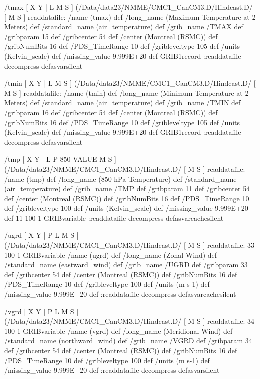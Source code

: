 \begin{ingrid}
/tmax {
[ X Y | L M S ]
(/Data/data23/NMME/CMC1_CanCM3.D/Hindcast.D/%
[ M S ]
readdatafile: 
/name (tmax) def
/long_name (Maximum Temperature at 2 Meters) def
/standard_name (air_temperature) def
/grib_name /TMAX def
/gribparam 15 def
/gribcenter 54 def
/center (Montreal (RSMC)) def
/gribNumBits 16 def
/PDS_TimeRange 10 def
/gribleveltype 105 def
/units (Kelvin_scale) def
/missing_value 9.999E+20 def
GRIB1record
:readdatafile decompress
} defasvarsilent

/tmin {
[ X Y | L M S ]
(/Data/data23/NMME/CMC1_CanCM3.D/Hindcast.D/%
[ M S ]
readdatafile: 
/name (tmin) def
/long_name (Minimum Temperature at 2 Meters) def
/standard_name (air_temperature) def
/grib_name /TMIN def
/gribparam 16 def
/gribcenter 54 def
/center (Montreal (RSMC)) def
/gribNumBits 16 def
/PDS_TimeRange 10 def
/gribleveltype 105 def
/units (Kelvin_scale) def
/missing_value 9.999E+20 def
GRIB1record
:readdatafile decompress
} defasvarsilent

/tmp {
[ X Y | L P 850 VALUE M S ]
(/Data/data23/NMME/CMC1_CanCM3.D/Hindcast.D/%
[ M S ]
readdatafile: 
/name (tmp) def
/long_name (850 hPa Temperature) def
/standard_name (air_temperature) def
/grib_name /TMP def
/gribparam 11 def
/gribcenter 54 def
/center (Montreal (RSMC)) def
/gribNumBits 16 def
/PDS_TimeRange 10 def
/gribleveltype 100 def
/units (Kelvin_scale) def
/missing_value 9.999E+20 def
11 100 1 GRIBvariable
:readdatafile decompress
} defasvarcachesilent

/ugrd {
[ X Y | P L M S ]
(/Data/data23/NMME/CMC1_CanCM3.D/Hindcast.D/%
[ M S ]
readdatafile:
33 100 1 GRIBvariable 
/name (ugrd) def
/long_name (Zonal Wind) def
/standard_name (eastward_wind) def
/grib_name /UGRD def
/gribparam 33 def
/gribcenter 54 def
/center (Montreal (RSMC)) def
/gribNumBits 16 def
/PDS_TimeRange 10 def
/gribleveltype 100 def
/units (m s-1) def
/missing_value 9.999E+20 def
:readdatafile decompress
} defasvarcachesilent

/vgrd {
[ X Y | P L M S ]
(/Data/data23/NMME/CMC1_CanCM3.D/Hindcast.D/%
[ M S ]
readdatafile:
34 100 1 GRIBvariable 
/name (vgrd) def
/long_name (Meridional Wind) def
/standard_name (northward_wind) def
/grib_name /VGRD def
/gribparam 34 def
/gribcenter 54 def
/center (Montreal (RSMC)) def
/gribNumBits 16 def
/PDS_TimeRange 10 def
/gribleveltype 100 def
/units (m s-1) def
/missing_value 9.999E+20 def
:readdatafile decompress
} defasvarsilent


\end{ingrid}

